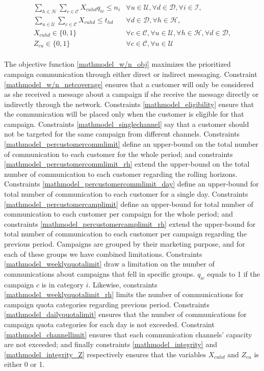 \documentclass[11pt]{article}
\begin{document}
\begin{align}
&\sum\limits_{h\in\mathcal{H}}\sum\limits_{c\in\mathcal{C}}X_{{c}{u}{h}{d}}  q_{{i}{c}} \leq n_{i} &\forall u \in \mathcal{U}, \forall d \in \mathcal{D}, \forall i \in \mathcal{I}, \label{mathmodel_dailyquotalimit}&\\
&\sum\limits_{u\in\mathcal{U}}\sum\limits_{c\in\mathcal{C}}X_{{c}{u}{h}{d}} \leq t_{{h}{d}} &\forall d \in \mathcal{D}, \forall h \in \mathcal{H}, \label{mathmodel_channellimit}&\\
&X_{{c}{u}{h}{d}} \in \{0,1\}&\forall c \in \mathcal{C}, \forall u \in \mathcal{U}, \forall h \in \mathcal{H}, \forall d \in \mathcal{D}, \label{mathmodel_integrity}&\\
&Z_{{c}{u}} \in \{0,1\}&\forall c \in \mathcal{C}, \forall u \in \mathcal{U} \label{mathmodel_integrity_Z}
\end{align}\\

The objective function \eqref{mathmodel_w/n_obj} maximizes the prioritized campaign communication through either direct or indirect messaging. Constraint \eqref{mathmodel_w/n_netcoverage} ensures that a customer will only be considered as she received a message about a campaign if she receive the message directly or indirectly through the network. Constraints \eqref{mathmodel_eligibility} ensure that the communication will be placed only when the customer is eligible for that campaign. Constraints \eqref{mathmodel_singlechannel} say that a customer should not be targeted for the same campaign from different channels. Constraints \eqref{mathmodel_percustomercommlimit} define an upper-bound on the total number of communication to each customer for the whole period; and constraints \eqref{mathmodel_percustomercommlimit_rh} extend the upper-bound on the total number of communication to each customer regarding the rolling horizons. Constraints \eqref{mathmodel_percustomercommlimit_day} define an upper-bound for total number of communication to each customer for a single day. Constraints \eqref{mathmodel_percustomercamplimit} define an upper-bound for total number of communication to each customer per campaign for the whole period; and constraints \eqref{mathmodel_percustomercamplimit_rh} extend the upper-bound for total number of communication to each customer per campaign regarding the previous period. Campaigns are grouped by their marketing purpose, and for each of these groups we have combined limitations. Constraints \eqref{mathmodel_weeklyquotalimit} draw a limitation on the number of communications about campaigns that fell in specific groups. $q_{{i}{c}}$ equals to 1 if the campaign $c$ is in category  $i$. Likewise, constraints \eqref{mathmodel_weeklyquotalimit_rh} limits the number of communications for campaign quota categories regarding previous period. Constraints \eqref{mathmodel_dailyquotalimit} ensures that the number of communications for campaign quota categories for each day is not exceeded. Constraint \eqref{mathmodel_channellimit} ensures that each communication channels' capacity are not exceeded; and finally constraints \eqref{mathmodel_integrity} and \eqref{mathmodel_integrity_Z} respectively ensures that the variables $X_{{c}{u}{h}{d}}$ and $Z_{{c}{u}}$ is either 0 or 1.\\
\end{document}
